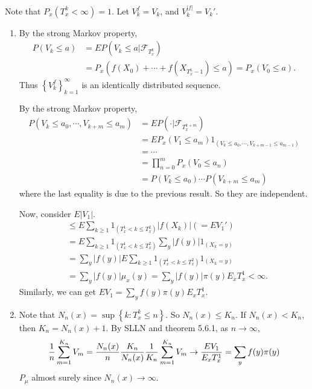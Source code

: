 \begin{problem}[5.6.5]\hfill

	Note that $P_x(T_x^k < \infty) = 1$.
	Let $V_k^f = V_k$, and $V_k^{\lvert f \lvert} = V_k'$.
	\begin{enumerate}
		\item By the strong Markov property,
			\[
				\begin{split}
					P(V_k \le a)
					&= EP\left( V_k \le a \lvert \mathcal{F}_{T_x^k} \right)\\
					&= P_x\left( f(X_0) + \cdots + f(X_{T_x^1 - 1}) \le a \right)
					= P_x(V_0 \le a).
				\end{split}
			\]
			Thus $\left\{ V_k^f \right\}_{k=1}^\infty$ is an identically distributed sequence.

			By the strong Markov property,
			\[
				\begin{split}
					P(V_k \le a_0, \cdots, V_{k+m} \le a_m)
					&= EP( \cdot \lvert \mathcal{F}_{T_x^{k+m}} ) \\
					&= EP_x(V_1 \le a_m) 1_{\left( V_k \le a_0, \cdots, V_{k+m-1} \le a_{m-1} \right)} \\
					&= \cdots \\
					&= \prod_{n=0}^m P_x\left( V_0 \le a_n \right) \\
					&= P\left( V_k \le a_0 \right) \cdots P\left( V_{k+m} \le a_m \right)
				\end{split}
			\]
			where the last equality is due to the previous result.
			So they are independent.

			Now, consider $E|V_1|$.
			\[
				\begin{split}
				&\le E\sum_{k\ge 1} 1_{\left( T_x^1 < k \le T_x^2 \right)} |f(X_k)| (= EV_1') \\
				&= E\sum_{k\ge 1} 1_{\left( T_x^1 < k \le T_x^2 \right)} \sum_y |f(y)| 1_{\left( X_k = y \right)}\\
				&= \sum_y |f(y)| E \sum_{k\ge 1} 1_{\left( T_x^1 < k \le T_x^2 \right)}1_{\left( X_k = y \right)}\\
				&= \sum_y |f(y)| \mu_x(y) = \sum_y |f(y)| \pi(y) E_x T_x^1 < \infty.
				\end{split}
			\]
			Similarly, we can get $EV_1 = \sum_y f(y) \pi(y) E_x T_x^1.$

		\item Note that $N_n(x) = \sup\left\{ k: T_x^k \le n \right\}.$
			So $N_n(x) \le K_n$.
			If $N_n(x) < K_n$, then $K_n = N_n(x) + 1$.
			By SLLN and theorem 5.6.1, as $n\rightarrow \infty$,
			\[
				{1 \over n} \sum_{m=1}^{K_n}V_m
				= {N_n(x) \over n} {K_n \over N_n(x)} {1 \over K_n} \sum_{m=1}^{K_n}V_m
				\rightarrow {EV_1 \over E_x T_x^1}
				= \sum_y f(y) \pi(y)
			\]
			$P_\mu$ almost surely since $N_n(x) \rightarrow \infty.$


\end{enumerate}
\end{problem}
